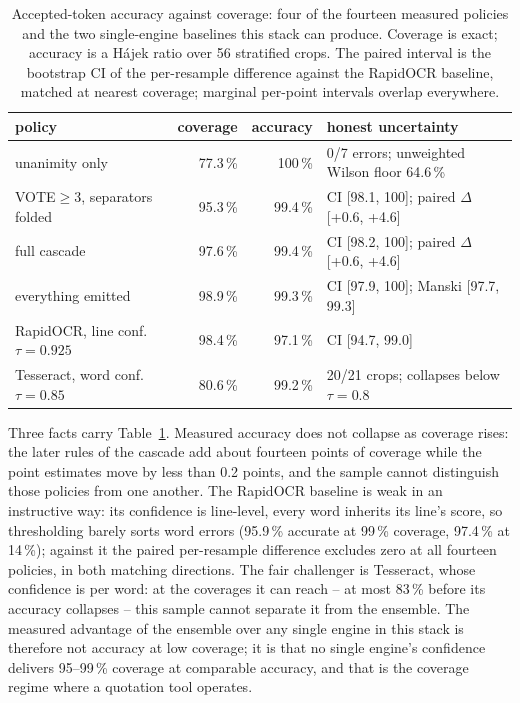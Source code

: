 \documentclass[11pt,a4paper]{article}
\begin{document}
\begin{table}[t]
\centering
\caption{Accepted-token accuracy against coverage: four of the fourteen measured
policies and the two single-engine baselines this stack can produce. Coverage is exact;
accuracy is a H\'ajek ratio over 56 stratified crops. The paired interval is the
bootstrap CI of the per-resample difference against the RapidOCR baseline, matched at
nearest coverage; marginal per-point intervals overlap everywhere.}
\label{tab:riskcov}
\footnotesize
\begin{tabular}{lrrl}
\toprule
policy & coverage & accuracy & honest uncertainty \\
\midrule
unanimity only & 77.3\,\% & 100\,\% & 0/7 errors; unweighted Wilson floor 64.6\,\% \\
VOTE$\geq$3, separators folded & 95.3\,\% & 99.4\,\% & CI [98.1, 100]; paired $\Delta$ [+0.6, +4.6] \\
full cascade & 97.6\,\% & 99.4\,\% & CI [98.2, 100]; paired $\Delta$ [+0.6, +4.6] \\
everything emitted & 98.9\,\% & 99.3\,\% & CI [97.9, 100]; Manski [97.7, 99.3] \\
\midrule
RapidOCR, line conf.\ $\tau{=}0.925$ & 98.4\,\% & 97.1\,\% & CI [94.7, 99.0] \\
Tesseract, word conf.\ $\tau{=}0.85$ & 80.6\,\% & 99.2\,\% & 20/21 crops; collapses below $\tau{=}0.8$ \\
\bottomrule
\end{tabular}
\end{table}

Three facts carry Table~\ref{tab:riskcov}. Measured accuracy does not collapse as
coverage rises: the later rules of the cascade add about fourteen points of coverage
while the point estimates move by less than 0.2 points, and the sample cannot
distinguish those policies from one another. The RapidOCR baseline is weak in an
instructive way: its confidence is line-level, every word inherits its line's score, so
thresholding barely sorts word errors (95.9\,\% accurate at 99\,\% coverage, 97.4\,\% at
14\,\%); against it the paired per-resample difference excludes zero at all fourteen
policies, in both matching directions. The fair challenger is Tesseract, whose
confidence is per word: at the coverages it can reach -- at most 83\,\% before its
accuracy collapses -- this sample cannot separate it from the ensemble. The measured
advantage of the ensemble over any single engine in this stack is therefore not accuracy
at low coverage; it is that no single engine's confidence delivers 95--99\,\% coverage
at comparable accuracy, and that is the coverage regime where a quotation tool operates.
\end{document}
